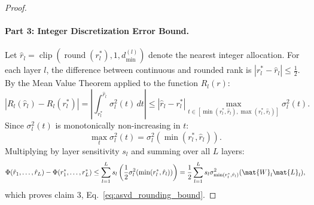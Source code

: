 \begin{proof}
\paragraph{Part 3: Integer Discretization Error Bound.}
Let $\hat{r}_l = \operatorname{clip}(\operatorname{round}(r_l^*), 1, d_{\min}^{(l)})$ denote the nearest integer allocation. For each layer $l$, the difference between continuous and rounded rank is $|r_l^* - \hat{r}_l| \le \frac{1}{2}$.
By the Mean Value Theorem applied to the function $R_l(r)$:
\begin{equation}
|R_l(\hat{r}_l) - R_l(r_l^*)| = \left| \int_{r_l^*}^{\hat{r}_l} \sigma_l^2(t) \, dt \right| \le |\hat{r}_l - r_l^*| \max_{t \in [\min(r_l^*, \hat{r}_l), \max(r_l^*, \hat{r}_l)]} \sigma_l^2(t).
\end{equation}
Since $\sigma_l^2(t)$ is monotonically non-increasing in $t$:
\begin{equation}
\max_{t} \sigma_l^2(t) = \sigma_l^2(\min(r_l^*, \hat{r}_l)).
\end{equation}
Multiplying by layer sensitivity $s_l$ and summing over all $L$ layers:
\begin{equation}
\Phi(\hat{r}_1, \dots, \hat{r}_L) - \Phi(r_1^*, \dots, r_L^*) \le \sum_{l=1}^L s_l \left( \frac{1}{2} \sigma_l^2(\min(r_l^*, \hat{r}_l)) \right) = \frac{1}{2} \sum_{l=1}^L s_l \sigma_{\min(r_l^*, \hat{r}_l)}^2(\mat{W}_l \mat{L}_l),
\end{equation}
which proves claim 3, Eq.~\eqref{eq:asvd_rounding_bound}.


\end{proof}
